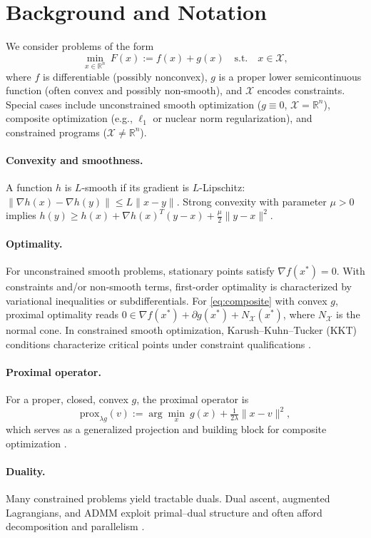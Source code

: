 \section{Background and Notation}
\label{sec:background}
We consider problems of the form
\begin{equation}
  \min_{x \in \mathbb{R}^n}~ F(x) := f(x) + g(x) \quad \text{s.t.} \quad x \in \mathcal{X},
  \label{eq:composite}
\end{equation}
where $f$ is differentiable (possibly nonconvex), $g$ is a proper lower semicontinuous function (often convex and possibly non-smooth), and $\mathcal{X}$ encodes constraints. Special cases include unconstrained smooth optimization ($g\equiv 0$, $\mathcal{X}=\mathbb{R}^n$), composite optimization (e.g., $\ell_1$ or nuclear norm regularization), and constrained programs ($\mathcal{X} \neq \mathbb{R}^n$).

\paragraph{Convexity and smoothness.} A function $h$ is $L$-smooth if its gradient is $L$-Lipschitz: $\|\nabla h(x)-\nabla h(y)\|\le L\|x-y\|$. Strong convexity with parameter $\mu>0$ implies $h(y)\ge h(x) + \nabla h(x)^T(y-x) + \tfrac{\mu}{2}\|y-x\|^2$.

\paragraph{Optimality.} For unconstrained smooth problems, stationary points satisfy $\nabla f(x^*)=0$. With constraints and/or non-smooth terms, first-order optimality is characterized by variational inequalities or subdifferentials. For \eqref{eq:composite} with convex $g$, proximal optimality reads $0 \in \nabla f(x^*) + \partial g(x^*) + N_{\mathcal{X}}(x^*)$, where $N_{\mathcal{X}}$ is the normal cone. In constrained smooth optimization, Karush–Kuhn–Tucker (KKT) conditions characterize critical points under constraint qualifications \cite{nocedal2006numerical,bertsekas1999nonlinear,rockafellar1970convex}.

\paragraph{Proximal operator.} For a proper, closed, convex $g$, the proximal operator is
\begin{equation}
  \mathrm{prox}_{\lambda g}(v) := \arg\min_{x}~ g(x) + \tfrac{1}{2\lambda}\|x-v\|^2,
\end{equation}
which serves as a generalized projection and building block for composite optimization \cite{parikh2014prox,beck2009fista}.

\paragraph{Duality.} Many constrained problems yield tractable duals. Dual ascent, augmented Lagrangians, and ADMM exploit primal–dual structure and often afford decomposition and parallelism \cite{boyd2004convex,boyd2011admm}.